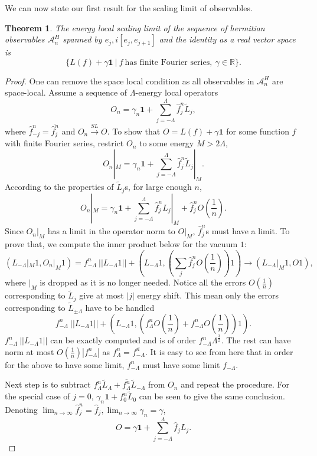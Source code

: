 \documentclass[twoside,11pt,titlepage]{amsart}
\renewcommand{\=}[1]{\stackrel{#1}{=}} %
\newtheorem{thm}{Theorem}[section]
\theoremstyle{definition}
\theoremstyle{remark}
\begin{document}
We can now state our first result for the scaling limit of observables.
\begin{thm}\label{thm4.2}
The energy local scaling limit of the sequence of hermitian observables $\mathcal{A}_n^H$ spanned by $e_j,i[e_j,e_{j+1}]$ and the identity as a real vector space is 
$$\{L(f)+\gamma\textbf{1} \ | \ f \ \text{has finite Fourier series},\ \gamma\in \mathbb{R} \}.$$
\end{thm}
\begin{proof}
One can remove the space local condition as all observables in $\mathcal{A}_n^H$ are space-local. Assume a sequence of $\Lambda$-energy local operators
$$O_n=\gamma_n\textbf{1}+\sum_{j=-\Lambda}^{\Lambda} \hat{f}_j^n\widetilde{L}_j,$$
where $\hat{f}_{-j}^n=\overline{\hat{f}_j^n}$ and $O_n \xrightarrow{SL} O$. To show that $O=L(f)+\gamma\textbf{1}$ for some function $f$ with finite Fourier series, restrict $O_n$ to some energy $M>2\Lambda$, 
$$O_n|_M=\gamma_n\textbf{1}+\sum_{j=-\Lambda}^{\Lambda}\hat{f}_j^n\widetilde{L}_j|_M.$$
According to the properties of $\widetilde{L}_j$s, for large enough $n$, 
$$O_n|_M=\gamma_n\textbf{1}+\sum_{j=-\Lambda}^{\Lambda}\hat{f}_j^nL_j|_M+\hat{f}_j^nO(\frac{1}{n}).$$
Since $O_n|_M$ has a limit in the operator norm to $O|_M$, $\hat{f}_j^n$s must have a limit. To prove that, we compute the inner product below for the vacuum $1$:
$$(L_{-\Lambda}|_M1,O_n|_M1)=f_{-\Lambda}^n\ ||L_{-\Lambda}1||+ (L_{-\Lambda}1,(\sum_j \hat{f}_j^nO(\frac{1}{n}))1)  \to (L_{-\Lambda}|_M1,O1),$$
where $|_M$ is dropped as it is no longer needed. Notice all the errors $O(\frac{1}{n})$ corresponding to $\widetilde{L}_j$ give at most $|j|$ energy shift. This mean only the errors corresponding to $\widetilde{L}_{\pm \Lambda}$ have to be handled
$$f_{-\Lambda}^n\ ||L_{-\Lambda}1||+(L_{-\Lambda}1,(f_\Lambda^nO(\frac{1}{n})+f_{-\Lambda}^nO(\frac{1}{n}))1).$$
$f_{-\Lambda}^n\ ||L_{-\Lambda}1||$ can be exactly computed and is of order  $f_{-\Lambda}^n \Lambda^\frac{3}{2}$. The rest can have norm at most $O(\frac{1}{n})|f_{-\Lambda}^n|$ as $f_\Lambda^n=\overline{f_{-\Lambda}^n}$. It is easy to see from here that in order for the above to have some limit,  $f_{-\Lambda}^n$ must have some limit $f_{-\Lambda}$.  

Next step is to subtract $f_{\Lambda}^n\widetilde{L}_\Lambda+\overline{f_{\Lambda}^n}\widetilde{L}_{-\Lambda}$ from $O_n$ and repeat the procedure. For the special case of $j=0$,  $\gamma_n\textbf{1}+f_0^n\widetilde{L}_0$ can be seen to give the same conclusion. Denoting $\lim_{n\to \infty} \hat{f}_j^n= \hat{f}_j, \lim_{n\to \infty} \gamma_n=\gamma$,
$$O=\gamma\textbf{1}+\sum_{j=-\Lambda}^\Lambda \hat{f}_jL_j.$$
\end{proof}
\end{document}
